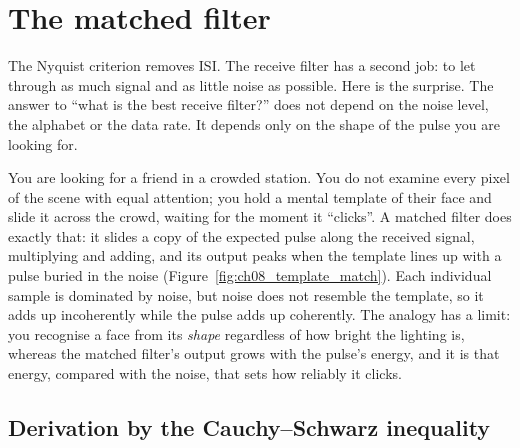 \section{The matched filter}
\label{sec:ch08:mf}

The Nyquist criterion removes ISI. The receive filter has a second job: to let through as much
signal and as little noise as possible. Here is the surprise. The answer to ``what is the best
receive filter?'' does not depend on the noise level, the alphabet or the data rate. It depends
only on the shape of the pulse you are looking for.

\begin{analogy}
You are looking for a friend in a crowded station. You do not examine every pixel of the
scene with equal attention; you hold a mental template of their face and slide it across the
crowd, waiting for the moment it ``clicks''. A matched filter does exactly that: it slides a
copy of the expected pulse along the received signal, multiplying and adding, and its output
peaks when the template lines up with a pulse buried in the noise
(Figure~\ref{fig:ch08_template_match}). Each individual sample is dominated by noise, but
noise does not resemble the template, so it adds up incoherently while the pulse adds up
coherently. The analogy has a limit: you recognise a face from its \emph{shape} regardless of
how bright the lighting is, whereas the matched filter's output grows with the pulse's energy,
and it is that energy, compared with the noise, that sets how reliably it clicks.
\end{analogy}


\subsection{Derivation by the Cauchy--Schwarz inequality}

